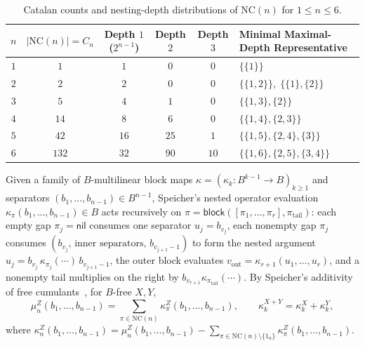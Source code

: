 \documentclass[11pt,a4paper]{article}
\theoremstyle{definition}
\newcommand{\NC}{\mathrm{NC}}
\begin{document}
\begin{table}[ht]
\centering
\small
\begin{tabular}{@{}cccccl@{}}
\toprule
$n$ & $|\NC(n)| = C_n$ & Depth $1$ ($2^{n-1}$) & Depth $2$ & Depth $3$ & Minimal Maximal-Depth Representative \\
\midrule
$1$ & $1$ & $1$ & $0$ & $0$ & $\{\{1\}\}$ \\
$2$ & $2$ & $2$ & $0$ & $0$ & $\{\{1,2\}\},\; \{\{1\},\{2\}\}$ \\
$3$ & $5$ & $4$ & $1$ & $0$ & $\{\{1,3\},\{2\}\}$ \\
$4$ & $14$ & $8$ & $6$ & $0$ & $\{\{1,4\},\{2,3\}\}$ \\
$5$ & $42$ & $16$ & $25$ & $1$ & $\{\{1,5\},\{2,4\},\{3\}\}$ \\
$6$ & $132$ & $32$ & $90$ & $10$ & $\{\{1,6\},\{2,5\},\{3,4\}\}$ \\
\bottomrule
\end{tabular}
\caption{Catalan counts and nesting-depth distributions of $\NC(n)$ for $1 \le n \le 6$.}
\label{tab:nc-depths}
\end{table}

Given a family of $B$-multilinear block maps $\kappa = (\kappa_k \colon B^{k-1} \to B)_{k \ge 1}$ and separators $(b_1, \dots, b_{n-1}) \in B^{n-1}$, Speicher's nested operator evaluation $\kappa_\pi(b_1, \dots, b_{n-1}) \in B$ acts recursively on $\pi = \mathsf{block}([\pi_1, \dots, \pi_r], \pi_{\mathrm{tail}})$: each empty gap $\pi_j = \mathsf{nil}$ consumes one separator $u_j = b_{v_j}$, each nonempty gap $\pi_j$ consumes $(b_{v_j},\, \text{inner separators},\, b_{v_{j+1}-1})$ to form the nested argument $u_j = b_{v_j}\, \kappa_{\pi_j}(\cdots)\, b_{v_{j+1}-1}$, the outer block evaluates $v_{\mathrm{out}} = \kappa_{r+1}(u_1, \dots, u_r)$, and a nonempty tail multiplies on the right by $b_{v_{r+1}} \kappa_{\pi_{\mathrm{tail}}}(\cdots)$. By Speicher's additivity of free cumulants~\cite{Speicher1998}, for $B$-free $X, Y$,
\begin{equation}\label{eq:speicher-conv}
\mu_n^Z(b_1, \dots, b_{n-1}) = \sum_{\pi \in \NC(n)} \kappa_\pi^Z(b_1, \dots, b_{n-1}), \qquad
\kappa_k^{X+Y} = \kappa_k^X + \kappa_k^Y,
\end{equation}
where $\kappa_n^Z(b_1, \dots, b_{n-1}) = \mu_n^Z(b_1, \dots, b_{n-1}) - \sum_{\pi \in \NC(n) \setminus \{1_n\}} \kappa_\pi^Z(b_1, \dots, b_{n-1})$.
\end{document}
